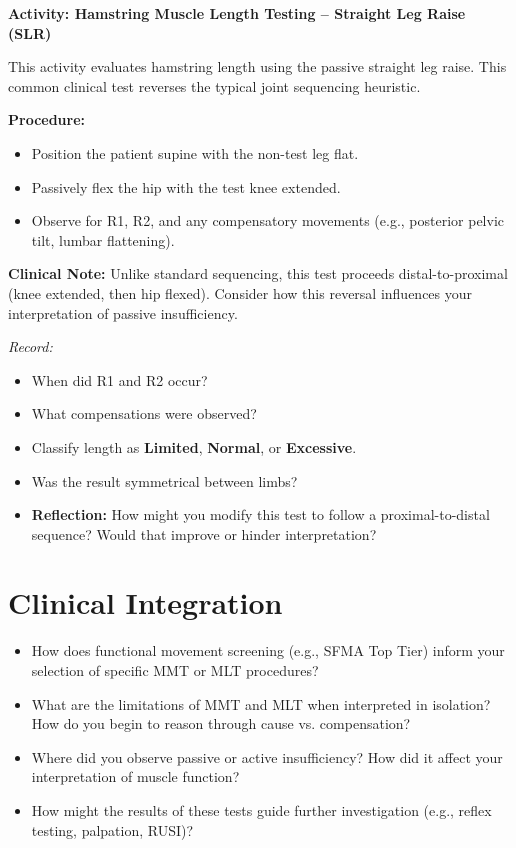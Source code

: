 \begin{labactivitybox}
\textbf{Activity: Hamstring Muscle Length Testing – Straight Leg Raise (SLR)}

This activity evaluates hamstring length using the passive straight leg raise. This common clinical test reverses the typical joint sequencing heuristic.

\textbf{Procedure:}
\begin{itemize}
  \item Position the patient supine with the non-test leg flat.
  \item Passively flex the hip with the test knee extended.
  \item Observe for R1, R2, and any compensatory movements (e.g., posterior pelvic tilt, lumbar flattening).
\end{itemize}

\textbf{Clinical Note:} Unlike standard sequencing, this test proceeds distal-to-proximal (knee extended, then hip flexed). Consider how this reversal influences your interpretation of passive insufficiency.

\textit{Record:}
\begin{itemize}
  \item When did R1 and R2 occur?
  \item What compensations were observed?
  \item Classify length as \textbf{Limited}, \textbf{Normal}, or \textbf{Excessive}.
  \item Was the result symmetrical between limbs?
  \item \textbf{Reflection:} How might you modify this test to follow a proximal-to-distal sequence? Would that improve or hinder interpretation?
\end{itemize}
\end{labactivitybox}

\section*{Clinical Integration}

\begin{itemize}
  \item How does functional movement screening (e.g., SFMA Top Tier) inform your selection of specific MMT or MLT procedures?
  \item What are the limitations of MMT and MLT when interpreted in isolation? How do you begin to reason through cause vs. compensation?
  \item Where did you observe passive or active insufficiency? How did it affect your interpretation of muscle function?
  \item How might the results of these tests guide further investigation (e.g., reflex testing, palpation, RUSI)?
\end{itemize}

